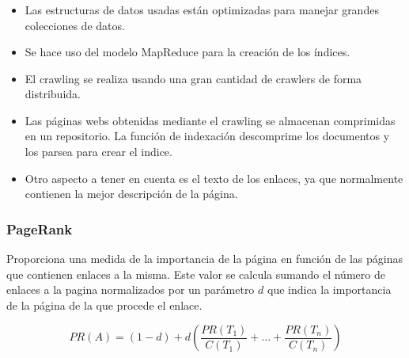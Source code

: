 \documentclass[9pt]{beamer} %
\begin{document}
\begin{frame}
	\frametitle{}
\begin{itemize}
	\item Las estructuras de datos usadas están optimizadas para manejar grandes colecciones de datos.
	\item Se hace uso del modelo MapReduce para la creación de los índices.
	\item El crawling se realiza usando una gran cantidad de crawlers de forma distribuida.
	\item Las páginas webs obtenidas mediante el crawling se almacenan comprimidas en un repositorio. La función de indexación descomprime los documentos y los parsea para crear el indice.
	\item Otro aspecto a tener en cuenta es el texto de los enlaces, ya que normalmente contienen la mejor descripción de la página.
\end{itemize}		
\end{frame}

\begin{frame}
	\frametitle{PageRank}
Proporciona una medida de la importancia de la página en función de las páginas que contienen enlaces a la misma. Este valor se calcula sumando el número de enlaces a la pagina normalizados por un parámetro $d$ que indica la importancia de la página de la que procede el enlace.

\[
PR(A)=(1-d)+d(\frac{PR(T_1)}{C(T_1)}+...+\frac{PR(T_n)}{C(T_n)})
\]
\end{frame}
\end{document}
